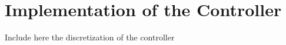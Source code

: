 \section{Implementation of the Controller}\label{impController}

Include here the discretization of the controller